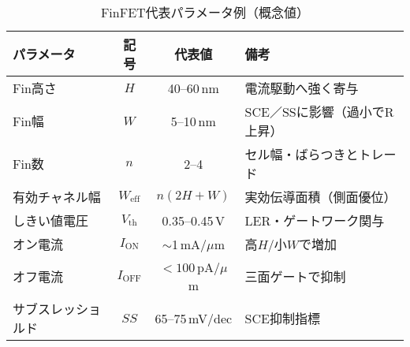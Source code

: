 \begin{table}[t]
  \centering
  \caption{FinFET代表パラメータ例（概念値）}
  \label{tab:finfet_params}
  \setlength{\tabcolsep}{4pt}
  \renewcommand{\arraystretch}{1.1}
  \small
  \begin{tabularx}{\linewidth}{l c c X}
    \toprule
    パラメータ & 記号 & 代表値 & 備考 \\
    \midrule
    Fin高さ & $H$ & 40--60\,nm & 電流駆動へ強く寄与 \\
    Fin幅   & $W$ & 5--10\,nm & SCE／SSに影響（過小でR上昇） \\
    Fin数   & $n$ & 2--4 & セル幅・ばらつきとトレード \\
    有効チャネル幅 & $W_\mathrm{eff}$ & $n(2H+W)$ & 実効伝導面積（側面優位） \\
    しきい値電圧 & $V_\mathrm{th}$ & 0.35--0.45\,V & LER・ゲートワーク関与 \\
    オン電流 & $I_\mathrm{ON}$ & $\sim$1\,mA/$\mu$m & 高$H$/小$W$で増加 \\
    オフ電流 & $I_\mathrm{OFF}$ & $<100$\,pA/$\mu$m & 三面ゲートで抑制 \\
    サブスレッショルド & $SS$ & 65--75\,mV/dec & SCE抑制指標 \\
    \bottomrule
  \end{tabularx}
\end{table}
